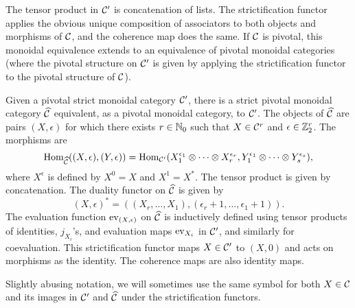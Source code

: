 The tensor product in $\mathcal{C}'$ is concatenation of lists. The strictification functor applies the obvious unique composition of associators to both objects and morphisms of $\mathcal{C}$, and the coherence map does the same. If $\mathcal{C}$ is pivotal, this monoidal equivalence extends to an equivalence of pivotal monoidal categories (where the pivotal structure on $\mathcal{C}'$ is given by applying the strictification functor to the pivotal structure of $\mathcal{C}$).

Given a pivotal strict monoidal category $\mathcal{C}'$, there is a strict pivotal monoidal category $\widehat {\mathcal{C}}$ equivalent, as a pivotal monoidal category, to $\mathcal{C}'$.  The objects of $\widehat {\mathcal{C}}$ are pairs $(X, \epsilon)$ for which there exists $r \in \mathbb{N}_0$ such that $X \in \mathcal{C}^r$ and $\epsilon \in \mathbb{Z}_2^r$. The morphisms are
$$\operatorname{Hom}_{\widehat {\mathcal{C}}}((X, \epsilon), (Y, \epsilon)) = \operatorname{Hom}_{\mathcal{C}'}(X_1^{\epsilon_1} \otimes \cdots \otimes X_r^{\epsilon_r}, Y_1^{\epsilon_1} \otimes \cdots \otimes Y_s^{\epsilon_s}),$$
where $X^\epsilon$ is defined by $X^0 = X$ and $X^1 = X^*$. The tensor product is given by concatenation. The duality functor on $\widehat {\mathcal{C}}$ is given by
$$(X, \epsilon)^* = ((X_r, \ldots, X_1), (\epsilon_r + 1, \ldots, \epsilon_1 + 1)).$$
The evaluation function $\operatorname{ev}_{(X, \epsilon)}$ on $\widehat {\mathcal{C}}$ is inductively defined using tensor products of identities, $j_{X_i}$'s, and evaluation maps $\operatorname{ev}_{X_i}$ in $\mathcal{C}'$, and similarly for coevaluation.  This strictification functor maps $X \in \mathcal{C}'$ to $(X, 0)$ and acts on morphisms as the identity.  The coherence maps are also identity maps.

Slightly abusing notation, we will sometimes use the same symbol for both $X \in \mathcal{C}$ and its images in $\mathcal{C}'$ and $\widehat {\mathcal{C}}$ under the strictification functors.

